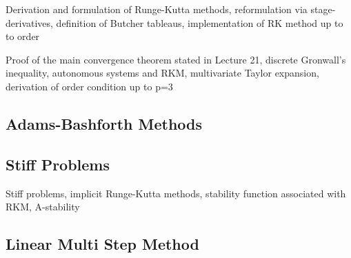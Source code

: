 \documentclass{article}
\theoremstyle{remark}
\begin{document}
\begin{tcolorbox}
  Derivation and formulation of Runge-Kutta methods, reformulation via stage-derivatives, definition of Butcher tableaus, implementation of RK method up to to order	
\end{tcolorbox}

\begin{tcolorbox}
  Proof of the main convergence theorem stated in Lecture 21, discrete Gronwall's inequality, autonomous systems and RKM, multivariate Taylor expansion, derivation of order condition up to p=3	
\end{tcolorbox}

\subsection{Adams-Bashforth Methods}%
\label{sub:adams_bashforth_methods}

\subsection{Stiff Problems}%
\label{sub:stiff_problems}
\begin{tcolorbox}
  Stiff problems, implicit Runge-Kutta methods, stability function associated with RKM, A-stability	
\end{tcolorbox}

\subsection{Linear Multi Step Method}%
\label{sub:linear_multi_step_method}

 




\end{document}
